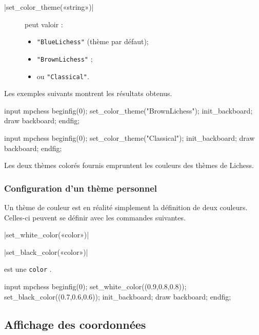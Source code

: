 \documentclass[french]{ltxdoc}
\begin{document}
\commande|set_color_theme(«string»)|\smallskip{}

\begin{description}
  \item[] peut valoir :
\begin{itemize}
\item \lstinline+"BlueLichess"+ (thème par défaut);
\item \lstinline+"BrownLichess"+ ;
\item ou \lstinline+"Classical"+.
\end{itemize}
\end{description}

Les exemples suivants montrent les résultats obtenus.
\begin{ExempleMP}
input mpchess
beginfig(0);
set_color_theme("BrownLichess");
init_backboard;
draw backboard;
endfig;
\end{ExempleMP}
\begin{ExempleMP}
input mpchess
beginfig(0);
set_color_theme("Classical");
init_backboard;
draw backboard;
endfig;
\end{ExempleMP}

Les deux thèmes colorés fournis empruntent les couleurs des thèmes de Lichess.

\subsubsection{Configuration d’un thème personnel}

Un thème de couleur est en réalité simplement la définition de deux couleurs.
Celles-ci peuvent se définir avec les commandes suivantes.

\commande|set_white_color(«color»)|\par
\commande|set_black_color(«color»)|\smallskip

 est une \lstinline+color+ \MP.

\begin{ExempleMP}
input mpchess
beginfig(0);
set_white_color((0.9,0.8,0.8));
set_black_color((0.7,0.6,0.6));
init_backboard;
draw backboard;
endfig;
\end{ExempleMP}
\subsection{Affichage des coordonnées}
\end{document}
